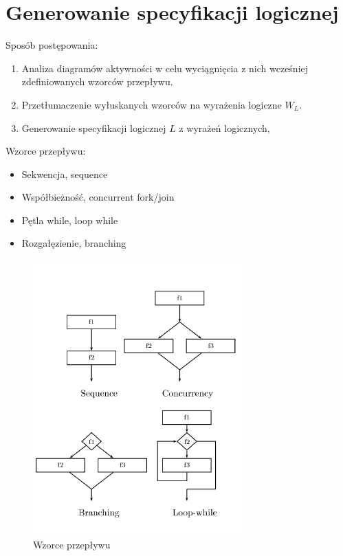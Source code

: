 \documentclass[a4paper, 11pt]{article}
\begin{document}
	\section{Generowanie specyfikacji logicznej}
	\noindent Sposób postępowania:
	\begin{enumerate}
	\item Analiza diagramów aktywności w celu wyciągnięcia z nich wcześniej zdefiniowanych wzorców przepływu.
	\item Przetłumaczenie wyłuskanych wzorców na wyrażenia logiczne $ W_L$.
	\item Generowanie specyfikacji logicznej $L$ z wyrażeń logicznych, %
	\end{enumerate}
Wzorce przepływu:
	\begin{itemize}
	\item Sekwencja, sequence
	\item Współbieżność, concurrent fork/join
	\item Pętla while, loop while
	\item Rozgałęzienie, branching
	\end{itemize}
	\begin{figure}[H]
		\centerline{\includegraphics[scale=1.5]{workflows}}
		\caption{Wzorce przepływu}
	\end{figure}%
	
\end{document}
